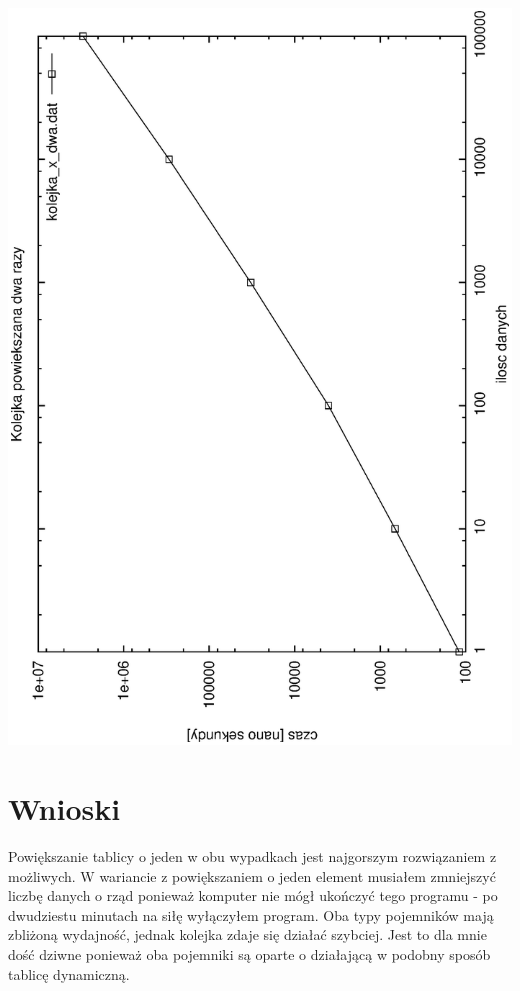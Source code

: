 \documentclass[a4paper,11pt]{report}
\begin{document}
\newline
\includegraphics[scale=0.55, angle=270]{wykresy/kolejka_x_dwa.eps}


\section{Wnioski}
Powiększanie tablicy o jeden w obu wypadkach jest najgorszym rozwiązaniem z możliwych. W wariancie z powiększaniem o jeden element musiałem zmniejszyć liczbę danych o rząd ponieważ komputer nie mógł ukończyć tego programu - po dwudziestu minutach na siłę wyłączyłem program.
Oba typy pojemników mają zbliżoną wydajność, jednak kolejka zdaje się działać szybciej. Jest to dla mnie dość dziwne ponieważ oba pojemniki są oparte o działającą w podobny sposób tablicę dynamiczną.
\end{document}

